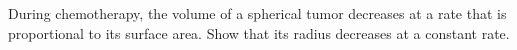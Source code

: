 During chemotherapy, the volume of a spherical tumor
decreases at a rate that is proportional to its surface
area. Show that its radius decreases at a constant rate.
